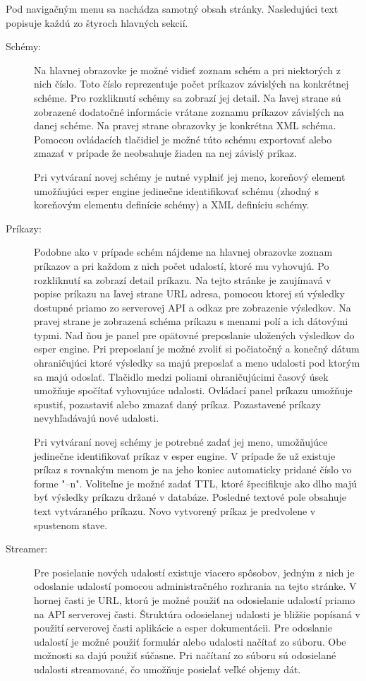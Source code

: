 	
	Pod navigačným menu sa nachádza samotný obsah stránky. Nasledujúci text popisuje každú zo štyroch hlavných sekcií.
	\begin{description}
		\item[Schémy:] Na hlavnej obrazovke je možné vidieť zoznam schém a pri niektorých z nich číslo. Toto číslo reprezentuje počet príkazov závislých na konkrétnej schéme. Pro rozkliknutí schémy sa zobrazí jej detail. Na ľavej strane sú zobrazené dodatočné informácie vrátane zoznamu príkazov závislých na danej schéme. Na pravej strane obrazovky je konkrétna XML schéma. Pomocou ovládacích tlačidiel je možné túto schému exportovať alebo zmazať v prípade že neobsahuje žiaden na nej závislý príkaz.

		Pri vytváraní novej schémy je nutné vyplniť jej meno, koreňový element umožňujúci esper engine jedinečne identifikovať schému (zhodný s koreňovým elementu definície schémy) a XML definíciu schémy.

		\item[Príkazy:] Podobne ako v prípade schém nájdeme na hlavnej obrazovke zoznam príkazov a pri každom z nich počet udalostí, ktoré mu vyhovujú. Po rozkliknutí sa zobrazí detail príkazu. Na tejto stránke je zaujímavá v popise príkazu na ľavej strane URL adresa, pomocou ktorej sú výsledky dostupné priamo zo serverovej API a odkaz pre zobrazenie výsledkov.
		Na pravej strane je zobrazená schéma príkazu s menami polí a ich dátovými typmi. Nad ňou je panel pre opätovné preposlanie uložených výsledkov do esper engine. Pri preposlaní je možné zvoliť si počiatočný a konečný dátum ohraničujúci ktoré výsledky sa majú preposlať a meno udalosti pod ktorým sa majú odoslať. Tlačidlo medzi poliami ohraničujúcimi časový úsek umožňuje spočítať vyhovujúce udalosti.
		Ovládací panel príkazu umožňuje spustiť, pozastaviť alebo zmazať daný príkaz. Pozastavené príkazy nevyhľadávajú nové udalosti.
		
		Pri vytváraní novej schémy je potrebné zadať jej meno, umožňujúce jedinečne identifikovať príkaz v esper engine. V prípade že už existuje príkaz s rovnakým menom je na jeho koniec automaticky pridané číslo vo forme "--n". Voliteľne je možné zadať TTL, ktoré špecifikuje ako dlho majú byť výsledky príkazu držané v databáze. Posledné textové pole obsahuje text vytváraného príkazu. Novo vytvorený príkaz je predvolene v spustenom stave.
		
		\item[Streamer:] Pre posielanie nových udalostí existuje viacero spôsobov, jedným z nich je odoslanie udalostí pomocou administračného rozhrania na tejto stránke. V hornej časti je URL, ktorú je možné použiť na odosielanie udalostí priamo na API serverovej časti. Štruktúra odosielanej udalosti je bližšie popísaná v použití serverovej časti aplikácie a esper dokumentácii.
		Pre odoslanie udalostí je možné použiť formulár alebo udalosti načítať zo súboru. Obe možnosti sa dajú použiť súčasne. Pri načítaní zo súboru sú odosielané udalosti streamované, čo umožňuje posielať veľké objemy dát.


\end{description}
